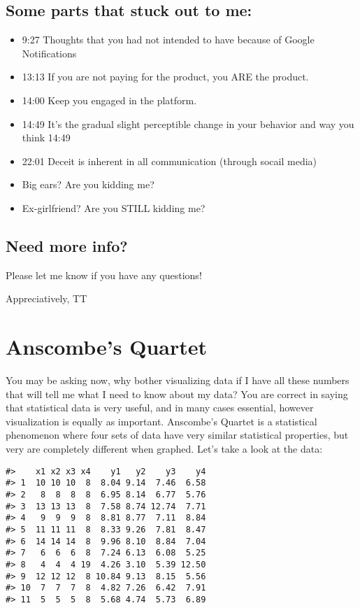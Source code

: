 \documentclass[
]{book}
\providecommand{\tightlist}{%
  \setlength{\itemsep}{0pt}\setlength{\parskip}{0pt}}
\begin{document}
\hypertarget{some-parts-that-stuck-out-to-me}{%
\section{Some parts that stuck out to me:}\label{some-parts-that-stuck-out-to-me}}

\begin{itemize}
\tightlist
\item
  9:27 Thoughts that you had not intended to have because of Google Notifications
\item
  13:13 If you are not paying for the product, you ARE the product.
\item
  14:00 Keep you engaged in the platform.
\item
  14:49 It's the gradual slight perceptible change in your behavior and way you think 14:49
\item
  22:01 Deceit is inherent in all communication (through socail media)
\item
  Big ears? Are you kidding me?
\item
  Ex-girlfriend? Are you STILL kidding me?
\end{itemize}

\hypertarget{need-more-info}{%
\section{Need more info?}\label{need-more-info}}

Please let me know if you have any questions!

Appreciatively,
TT

\hypertarget{anscombes-quartet}{%
\chapter{Anscombe's Quartet}\label{anscombes-quartet}}

You may be asking now, why bother visualizing data if I have all these numbers that will tell me what I need to know about my data? You are correct in saying that statistical data is very useful, and in many cases essential, however visualization is equally as important. Anscombe's Quartet is a statistical phenomenon where four sets of data have very similar statistical properties, but very are completely different when graphed. Let's take a look at the data:

\begin{verbatim}
#>    x1 x2 x3 x4    y1   y2    y3    y4
#> 1  10 10 10  8  8.04 9.14  7.46  6.58
#> 2   8  8  8  8  6.95 8.14  6.77  5.76
#> 3  13 13 13  8  7.58 8.74 12.74  7.71
#> 4   9  9  9  8  8.81 8.77  7.11  8.84
#> 5  11 11 11  8  8.33 9.26  7.81  8.47
#> 6  14 14 14  8  9.96 8.10  8.84  7.04
#> 7   6  6  6  8  7.24 6.13  6.08  5.25
#> 8   4  4  4 19  4.26 3.10  5.39 12.50
#> 9  12 12 12  8 10.84 9.13  8.15  5.56
#> 10  7  7  7  8  4.82 7.26  6.42  7.91
#> 11  5  5  5  8  5.68 4.74  5.73  6.89
\end{verbatim}
\end{document}
